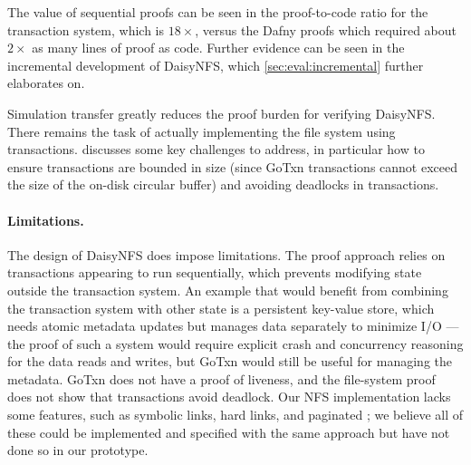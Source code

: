 The value of sequential proofs can be seen in the proof-to-code ratio for the
transaction system, which is $18\times$, versus the Dafny proofs which required
about $2\times$ as many lines of proof as code. Further evidence can be seen in
the incremental development of DaisyNFS, which \cref{sec:eval:incremental}
further elaborates on.

Simulation transfer greatly reduces the proof burden for verifying DaisyNFS.
There remains the task of actually implementing the file system using
transactions.  discusses some key challenges to address,
in particular how to ensure transactions are bounded in size (since GoTxn
transactions cannot exceed the size of the on-disk circular buffer) and avoiding
deadlocks in transactions.

\paragraph{Limitations.}
The design of DaisyNFS does impose limitations. The proof approach relies on
transactions appearing to run sequentially, which prevents modifying state
outside the transaction system. An example that would benefit from combining
the transaction system with other state is a
persistent key-value store, which needs atomic metadata updates but manages data
separately to minimize I/O --- the proof of such a system would
require explicit crash and concurrency reasoning for the data reads and writes,
but GoTxn would still be useful for managing the metadata. GoTxn does not have a
proof of liveness, and the file-system proof
does not show that transactions avoid deadlock. Our NFS implementation lacks
some features, such as symbolic links, hard links, and paginated ;
we believe all of these could be implemented and specified with the same
approach but have not done so in our prototype.
